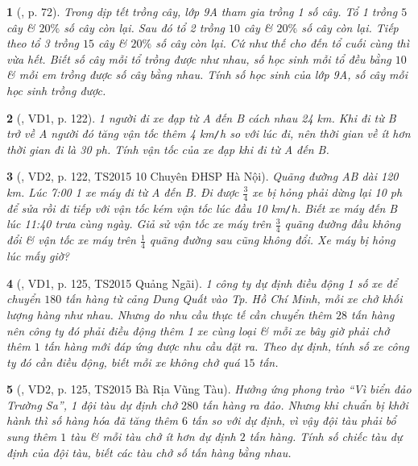 \documentclass{article}
\newtheorem{baitoan}{}
\begin{document}
\begin{baitoan}[\cite{Binh_boi_duong_Toan_9_tap_2}, p. 72]
	Trong dịp tết trồng cây, lớp 9A tham gia trồng 1 số cây. Tổ 1 trồng $5$ cây \& $20\%$ số cây còn lại. Sau đó tổ 2 trồng $10$ cây \& $20\%$ số cây còn lại. Tiếp theo tổ 3 trồng $15$ cây \& $20\%$ số cây còn lại. Cứ như thế cho đến tổ cuối cùng thì vừa hết. Biết số cây mỗi tổ trồng được như nhau, số học sinh mỗi tổ đều bằng $10$ \& mỗi em trồng được số cây bằng nhau. Tính số học sinh của lớp 9A, số cây mỗi học sinh trồng được.
\end{baitoan}

\begin{baitoan}[\cite{Kien_dai_so_9}, VD1, p. 122]
	1 người đi xe đạp từ A đến B cách nhau {\rm24 km}. Khi đi từ B trở về A người đó tăng vận tốc thêm {\rm4 km{\tt/}h} so với lúc đi, nên thời gian về ít hơn thời gian đi là {\rm30 ph}. Tính vận tốc của xe đạp khi đi từ A đến B.
\end{baitoan}

\begin{baitoan}[\cite{Kien_dai_so_9}, VD2, p. 122, TS2015 10 Chuyên ĐHSP Hà Nội]
	Quãng đường AB dài {\rm120 km}. Lúc {\rm7:00} 1 xe máy đi từ A đến B. Đi được $\frac{3}{4}$ xe bị hỏng phải dừng lại {\rm10 ph} để sửa rồi đi tiếp với vận tốc kém vận tốc lúc đầu {\rm10 km{\tt/}h}. Biết xe máy đến B lúc {\rm11:40} trưa cùng ngày. Giả sử vận tốc xe máy trên $\frac{3}{4}$ quãng đường đầu không đổi \& vận tốc xe máy trên $\frac{1}{4}$ quãng đường sau cũng không đổi. Xe máy bị hỏng lúc mấy giờ?
\end{baitoan}

\begin{baitoan}[\cite{Kien_dai_so_9}, VD1, p. 125, TS2015 Quảng Ngãi]
	1 công ty dự định điều động 1 số xe để chuyển $180$ tấn hàng từ cảng Dung Quất vào Tp. Hồ Chí Minh, mỗi xe chở khối lượng hàng như nhau. Nhưng do nhu cầu thực tế cần chuyển thêm $28$ tấn hàng nên công ty đó phải điều động thêm 1 xe cùng loại \& mỗi xe bây giờ phải chở thêm $1$ tấn hàng mới đáp ứng được nhu cầu đặt ra. Theo dự định, tính số xe công ty đó cần điều động, biết mỗi xe không chở quá $15$ tấn.
\end{baitoan}

\begin{baitoan}[\cite{Kien_dai_so_9}, VD2, p. 125, TS2015 Bà Rịa Vũng Tàu]
	Hưởng ứng phong trào ``Vì biển đảo Trường Sa'', 1 đội tàu dự định chở $280$ tấn hàng ra đảo. Nhưng khi chuẩn bị khởi hành thì số hàng hóa đã tăng thêm $6$ tấn so với dự định, vì vậy đội tàu phải bổ sung thêm $1$ tàu \& mỗi tàu chở ít hơn dự định $2$ tấn hàng. Tính số chiếc tàu dự định của đội tàu, biết các tàu chở số tấn hàng bằng nhau.
\end{baitoan}
\end{document}

